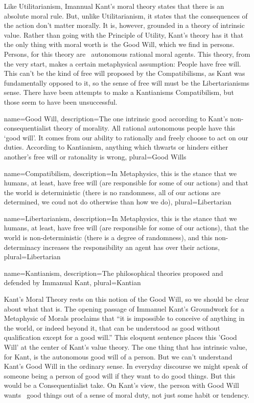 Like Utilitarianism, Imannual Kant’s moral theory states that there is an absolute moral rule. But, unlike Utilitarianism, it states that the consequences of the action don't matter morally. It is, however, grounded in a theory of intrinsic value. Rather than going with the Principle of Utility, Kant's theory has it that the only thing with moral worth is the \gls{Good Will}, which we find in persons. Persons, for this theory are  autonomous rational moral agents. This theory, from the very start, makes a certain metaphysical assumption: People have free will. This can't be the kind of free will proposed by the \glspl{Compatibilism}, as Kant was fundamentally opposed to it, so the sense of free will must be the \glspl{Libertarianism} sense. There have been attempts to make a \glspl{Kantianism} Compatibilism, but those seem to have been unsuccessful.\autocite{Vilhauer1}

{
  name=Good Will,
  description={The one intrinsic good according to Kant's non-consequentialist theory of morality. All rational autonomous people have this `good will'. It comes from our ability to rationally and freely choose to act on our duties. According to Kantianism, anything which thwarts or hinders either another's free will or ratonality is wrong},
  plural=Good Wills
}

{
  name=Compatibilism,
  description={In Metaphysics, this is the stance that we humans, at least, have free will (are responsible for some of our actions) and that the world is deterministic (there is no randomness, all of our actions are determined, we coud not do otherwise than how we do)},
  plural=Libertarian
}


{
  name=Libertarianism,
  description={In Metaphysics, this is the stance that we humans, at least, have free will (are responsible for some of our actions), that the world is non-deterministic (there is a degree of randomness), and this non-determinacy increases the responsibility an agent has over their actions},
  plural=Libertarian
}

{
  name=Kantianism,
  description={The philosophical theories proposed and defended by Immanual Kant},
  plural=Kantian
}


Kant's Moral Theory rests on this notion of the Good Will, so we should be clear about what that is. The opening passage of Immanuel Kant’s Groundwork for a Metaphysic of Morals proclaims that “it is impossible to conceive of anything in the world, or indeed beyond it, that can be understood as good without qualification except for a good will.” This eloquent sentence places this 'Good Will' at the center of Kant's value theory. The one thing that has intrinsic value, for Kant, is the autonomous good will of a person. But we can't understand Kant's Good Will in the ordinary sense. In everyday discourse we might speak of someone being a person of good will if they want to do good things. But this would be a Consequentialist take. On Kant’s view, the person with Good Will wants  good things out of a sense of moral duty, not just some habit or tendency.

